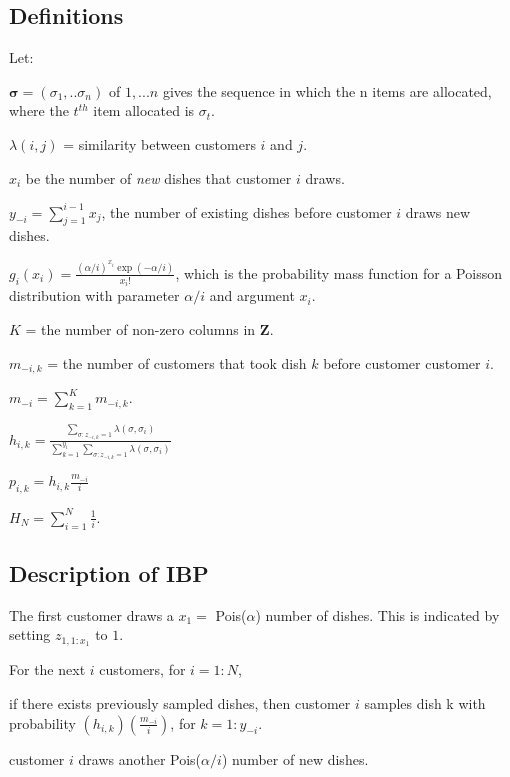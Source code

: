 \documentclass{article}
\def\prodl#1#2#3{\prod\limits_{#1=#2}^{#3}}
\def\suml#1#2#3{\sum\limits_{#1=#2}^{#3}}
\def\sums#1#2#3{\sum\limits_{#1:#2}^{#3}}
\def\ds{\displaystyle}
\renewenvironment{itemize}[1]{\begin{compactitem}#1}{\end{compactitem}}
\begin{document}
\subsection{Definitions}
\noindent
Let:
\begin{itemize}
  \item $\bm \sigma = (\sigma_1,..\sigma_n)$ of ${1,...n}$ gives the sequence
        in which the n items are allocated, where the $t^{th}$ item allocated
        is $\sigma_t$. 
  \item $\lambda(i,j)$ = similarity between customers $i$ and $j$.
  \item $x_i$ be the number of \textit{new} dishes that customer $i$ draws.\\ 
  \item $y_{-i} = \suml{j}{1}{i-1} x_j$, the number of existing dishes
        before customer $i$ draws new dishes.
  \item $g_i(x_i) = \ds\frac{(\alpha/i)^{x_i}\exp(-\alpha/i)}{x_i!}$, 
        which is the probability mass function for a Poisson distribution 
        with parameter $\alpha/i$ and argument $x_i$.\\
  \item $K$ = the number of non-zero columns in $\bm Z$.\\
  \item $m_{-i,k}$ = the number of customers that took dish $k$ before customer
        customer $i$.
  \item $m_{-i} = \suml{k}{1}{K}m_{-i,k}$.
  \item $h_{i,k} = \ds\frac{\sums{\sigma}{z_{-i,k}=1}{}\lambda(\sigma,\sigma_i)}
        {\suml{k}{1}{y_i}\sums{\sigma}{z_{-i,k}=1}{}\lambda(\sigma,\sigma_i)} $
  \item $p_{i,k} = h_{i,k} \ds\frac{m_{-i}}{i}$
  \item $H_N = \suml{i}{1}{N} \ds\frac{1}{i}$.
\end{itemize}


\subsection{Description of IBP}
\begin{itemize}
  \item The first customer draws a $x_1=$ Pois($\alpha$) number of dishes. This
        is indicated by setting $z_{1,1:x_1}$ to $1$.
  \item For the next $i$ customers, for $i=1:N$, 
     \begin{itemize}
       \item if there exists previously sampled dishes, then customer $i$
             samples dish k with probability $\left(h_{i,k}\right) 
             \left(\ds\frac{m_{-i}}{i}\right)$, for $ k = 1:y_{-i}$.
       \item customer $i$ draws another Pois($\alpha/i$) number of new dishes.
     \end{itemize}
\end{itemize}
\end{document}
